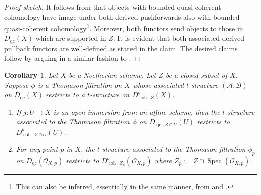 \documentclass[11pt]{amsart}
\theoremstyle{plain}
\newtheorem{corollary}[theorem]{Corollary}
\theoremstyle{definition}
\numberwithin{equation}{section}
\numberwithin{theorem}{section}
\begin{document}
\begin{proof}[Proof sketch]
    It follows from \cite[Proposition 3.9.2]{Lipman/Hashimoto:2009} that objects with bounded quasi-coherent cohomology have image under both derived pushforwards also with bounded quasi-coherent cohomology\footnote{This can also be inferred, essentially in the same manner, from \cite[\href{https://stacks.math.columbia.edu/tag/08D5}{Tag 08D5}]{StacksProject} and \cite[\href{https://stacks.math.columbia.edu/tag/05T6}{Tag 05T6}]{StacksProject}.}. Moreover, both functors send objects to those in $D_{\operatorname{qc}}(X)$ which are supported in $Z$. It is evident that both associated derived pullback functors are well-defined as stated in the claim. The desired claims follow by arguing in a similar fashion to \cite[Theorem 4.4]{Elagin/Lunts/Schnurer:2020}.
\end{proof}

\begin{corollary}\label{cor:descent_for_thomason_on_bounded}
    Let $X$ be a Noetherian scheme. Let $Z$ be a closed subset of $X$. Suppose $\phi$ is a Thomason filtration on $X$ whose associated $t$-structure $(\mathcal{A},\mathcal{B})$ on $D_{\operatorname{qc}}(X)$ restricts to a $t$-structure on $D^b_{\operatorname{coh},Z}(X)$. 
    \begin{enumerate}
        \item If $j \colon U \to X$ is an open immersion from an affine scheme, then the $t$-structure associated to the Thomason filtration $\phi$ on $D_{\operatorname{qc},Z\cap U}(U)$ restricts to $D^b_{\operatorname{coh},Z\cap U}(U)$.
        \item For any point $p$ in $X$, the $t$-structure associated to the Thomason filtration $\phi_p$ on $D_{\operatorname{qc}}(\mathcal{O}_{X,p})$ restricts to $D^b_{\operatorname{coh},Z_p}(\mathcal{O}_{X,p})$ where $Z_p:=Z\cap \operatorname{Spec}(\mathcal{O}_{X,p})$.
    \end{enumerate}
\end{corollary}
\end{document}
